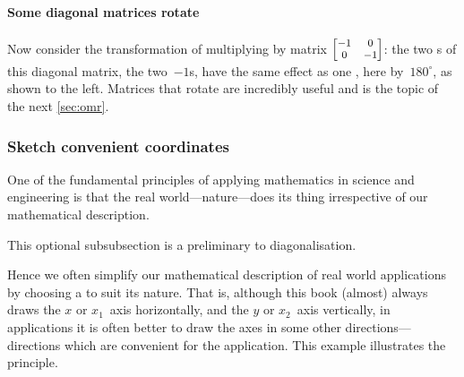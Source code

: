 \paragraph{Some diagonal matrices rotate}
Now consider the transformation of multiplying by matrix \(\footnotesize\begin{bmatrix} -1&0\\0&-1 \end{bmatrix}\):
%
the two s of this diagonal matrix, the two~\(-1\)s, have  the same effect as one , here by~\(180^\circ\), as shown to the left.
Matrices that rotate are incredibly useful and is the topic of the next \autoref{sec:omr}.





\subsubsection{Sketch convenient coordinates}
One of the fundamental principles of applying mathematics in science and engineering
is that the real world---nature---does its thing irrespective of our mathematical description.
\begin{aside}
This optional subsubsection is a preliminary to diagonalisation.
\end{aside}%
Hence we often simplify our mathematical description of real world applications by choosing a  to suit its nature.
That is, although this book (almost) always draws the \(x\) or \(x_1\)~axis horizontally, and the \(y\) or \(x_2\)~axis vertically, in applications it is often better to draw the axes in some other  directions---directions which are convenient for the application.
This example illustrates the principle.

